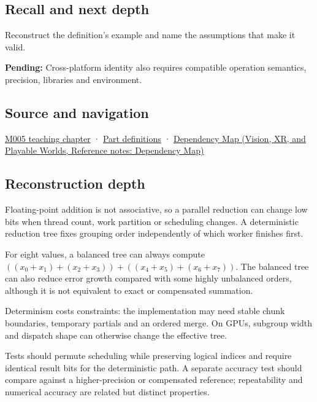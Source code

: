 \subsection{Recall and next depth}\label{appendix-4c8e0238e7ee-recall-and-next-depth}

\hypertarget{appendix-4c8e0238e7ee-recall-and-next-depth}{}

Reconstruct the definition's example and name the assumptions that make it valid.

\textbf{Pending:} Cross-platform identity also requires compatible operation semantics, precision, libraries and environment.

\subsection{Source and navigation}\label{appendix-4c8e0238e7ee-source-and-navigation}

\hypertarget{appendix-4c8e0238e7ee-source-and-navigation}{}

\hyperref[01-foundations-i-ch001-when-arithmetic-meets-uncertainty]{M005 teaching chapter} · \hyperref[appendix-fd090d982a15-m005---parts-77-88]{Part definitions} · \href{../07-Vision-XR-and-Playable-Worlds/main.pdf\#nameddest=appendix-4ad47bdd269a}{Dependency Map (Vision, XR, and Playable Worlds, Reference notes: Dependency Map)}

\subsection{Reconstruction depth}\label{appendix-4c8e0238e7ee-reconstruction-depth}

\hypertarget{appendix-4c8e0238e7ee-reconstruction-depth}{}

Floating-point addition is not associative, so a parallel reduction can change low bits when thread count, work partition or scheduling changes. A deterministic reduction tree fixes grouping order independently of which worker finishes first.

For eight values, a balanced tree can always compute \(((x_0+x_1)+(x_2+x_3)) + ((x_4+x_5)+(x_6+x_7))\). The balanced tree can also reduce error growth compared with some highly unbalanced orders, although it is not equivalent to exact or compensated summation.

Determinism costs constraints: the implementation may need stable chunk boundaries, temporary partials and an ordered merge. On GPUs, subgroup width and dispatch shape can otherwise change the effective tree.

Tests should permute scheduling while preserving logical indices and require identical result bits for the deterministic path. A separate accuracy test should compare against a higher-precision or compensated reference; repeatability and numerical accuracy are related but distinct properties.
